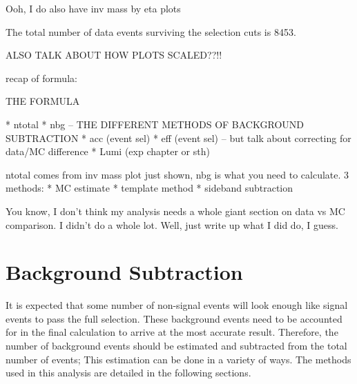 


Ooh, I do also have inv mass by eta plots

The total number of data events surviving 
the selection cuts is 8453.  

ALSO TALK ABOUT HOW PLOTS SCALED??!!


recap of formula:

THE FORMULA

   * ntotal
   * nbg -- THE DIFFERENT METHODS OF BACKGROUND SUBTRACTION
   * acc (event sel)
   * eff (event sel) -- but talk about correcting for data/MC difference
   * Lumi (exp chapter or sth)

ntotal comes from inv mass plot just shown, nbg is what you need to calculate.
3 methods: 
   * MC estimate
   * template method
   * sideband subtraction

You know, I don't think my analysis needs a whole giant section on data vs MC comparison.  
I didn't do a whole lot.  
Well, just write up what I did do, I guess.  

\section{Background Subtraction}
It is expected that some number of non-signal events %
will look enough like signal events to pass the full selection.  
These background events need to be accounted for 
in the final calculation to arrive 
at the most accurate result.  
Therefore, the number of background events should 
be estimated and subtracted from the total number 
of events; 
This estimation can be done in a variety of ways.  
The methods used in this analysis are detailed 
in the following sections.  

